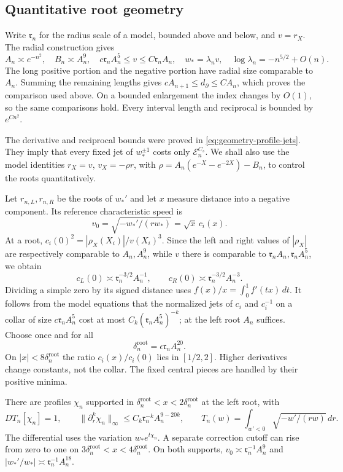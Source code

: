 \subsection{Quantitative root geometry}

Write $\mathfrak r_n$ for the radius scale of a model, bounded above
and below, and $v=r_X$. The radial construction gives
\[
 A_n\asymp e^{-n^2},\quad B_n\asymp A_n^9,\quad
 c\mathfrak r_n A_n^5\le v\le C\mathfrak r_n A_n,\quad
 w_* =\lambda_n v,\quad \log\lambda_n=-n^{5/2}+O(n).
\]
The long positive portion and the negative portion have radial size
comparable to $A_n$. Summing the remaining lengths gives
$cA_{n+1}\le d_\partial\le CA_n$, which proves the comparison used
above. On a bounded enlargement the index changes by $O(1)$, so the
same comparisons hold. Every interval length and reciprocal is bounded
by $e^{Cn^2}$.

The derivative and reciprocal bounds were proved in
\eqref{eq:geometry-profile-jets}. They imply that every fixed jet of
$w_*^{\pm1}$ costs only $\mathcal E_n^{C_s}$. We shall also use the
model identities $r_X=v$, $v_X=-\rho r$, with
$\rho=A_n(e^{-X}-e^{-2X})-B_n$, to control the roots quantitatively.

Let $r_{n,L},r_{n,R}$ be the roots of $w_*'$ and let $x$ measure
distance into a negative component. Its reference characteristic speed is
\[
 v_0=\sqrt{-w_*'/(rw_*)}=\sqrt{x}\,c_i(x).
\]
At a root,
$c_i(0)^2=|\rho_X(X_i)|/v(X_i)^3$. Since the left and right values
of $|\rho_X|$ are respectively comparable to $A_n,A_n^9$, while
$v$ there is comparable to $\mathfrak r_n A_n,
\mathfrak r_n A_n^5$, we obtain
\begin{equation}\label{eq:geometry-root-scales}
 c_L(0)\asymp\mathfrak r_n^{-3/2}A_n^{-1},\qquad
 c_R(0)\asymp\mathfrak r_n^{-3/2}A_n^{-3}.
\end{equation}
Dividing a simple zero by its signed distance uses
$f(x)/x=\int_0^1f'(tx)\,dt$. It follows from the model equations that
the normalized jets of $c_i$ and $c_i^{-1}$ on a collar of size
$c\mathfrak r_n A_n^5$ cost at most
$C_k(\mathfrak r_n A_n^5)^{-k}$; at the left root $A_n$ suffices.
Choose once and for all
\[
 \delta_n^{\mathrm{root}}=\epsilon\mathfrak r_n A_n^{20}.
\]
On $|x|<8\delta_n^{\mathrm{root}}$ the ratio $c_i(x)/c_i(0)$ lies in $[1/2,2]$.
Higher derivatives change constants, not the collar. The fixed central
pieces are handled by their positive minima.

\begin{lemma}
\label{lem:quantitative-optical-controls}
There are profiles $\chi_n$ supported in $\delta_n^{\mathrm{root}}<x<2\delta_n^{\mathrm{root}}$
at the left root, with
\[
 DT_n[\chi_n]=1,
 \qquad \|\partial_r^k\chi_n\|_\infty
       \le C_k\mathfrak r_n^{-k}A_n^{9-20k},
 \qquad T_n(w)=\int_{w'<0}\sqrt{-w'/(rw)}\,dr.
\]
The differential uses the variation $w_*e^{t\chi_n}$.
A separate correction cutoff can rise from zero to one on
$3\delta_n^{\mathrm{root}}<x<4\delta_n^{\mathrm{root}}$. On both supports,
$v_0\asymp\mathfrak r_n^{-1}A_n^9$ and
$|w_*'/w_*|\asymp\mathfrak r_n^{-1}A_n^{18}$.
\end{lemma}

